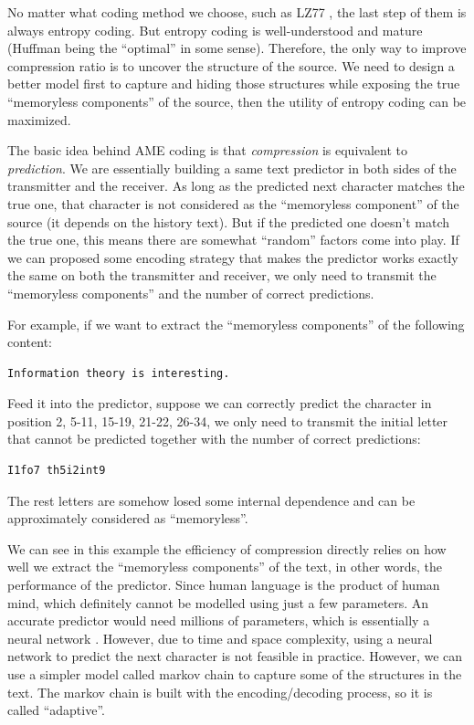 \documentclass[12pt,twoside]{article}
\begin{document}
No matter what coding method we choose, such as LZ77 \cite{ref6, ref7}, the last step of them is always entropy coding. But entropy coding is well-understood and mature (Huffman being the ``optimal'' in some sense). Therefore, the only way to improve compression ratio is to uncover the structure of the source. We need to design a better model first to capture and hiding those structures while exposing the true ``memoryless components'' of the source, then the utility of entropy coding can be maximized.

The basic idea behind AME coding is that \textit{compression} is equivalent to \textit{prediction}. We are essentially building a same text predictor in both sides of the transmitter and the receiver. As long as the predicted next character matches the true one, that character is not considered as the ``memoryless component'' of the source (it depends on the history text). But if the predicted one doesn't match the true one, this means there are somewhat ``random'' factors come into play. If we can proposed some encoding strategy that makes the predictor works exactly the same on both the transmitter and receiver, we only need to transmit the ``memoryless components'' and the number of correct predictions. 

For example, if we want to extract the ``memoryless components'' of the following content:

\begin{lstlisting}[language=bash, style=custombash]
Information theory is interesting.
\end{lstlisting}

Feed it into the predictor, suppose we can correctly predict the character in position 2, 5-11, 15-19, 21-22, 26-34, we only need to transmit the initial letter that cannot be predicted together with the number of correct predictions:

\begin{lstlisting}[language=bash, style=custombash]
I1fo7 th5i2int9
\end{lstlisting}

The rest letters are somehow losed some internal dependence and can be approximately considered as ``memoryless''. 

We can see in this example the efficiency of compression directly relies on how well we extract the ``memoryless components'' of the text, in other words, the performance of the predictor. Since human language is the product of human mind, which definitely cannot be modelled using just a few parameters. An accurate predictor would need millions of parameters, which is essentially a neural network \cite{ref5}. However, due to time and space complexity, using a neural network to predict the next character is not feasible in practice. However, we can use a simpler model called markov chain to capture some of the structures in the text. The markov chain is built with the encoding/decoding process, so it is called ``adaptive''.
\end{document}
